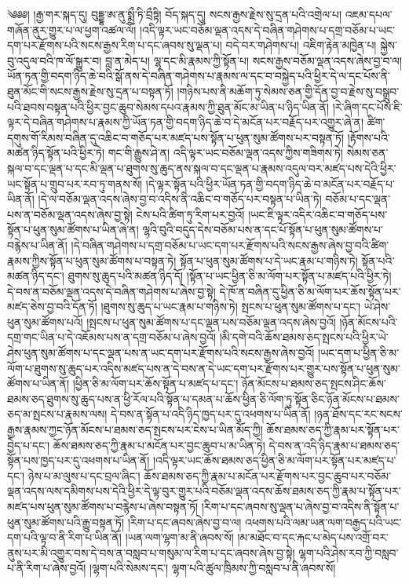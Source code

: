 ༄༅༅། །རྒྱ་གར་སྐད་དུ། བུདྡྷ་ཨ་ནུ་སྨྲྀ་ཏི་བྲྀཏྟི། བོད་སྐད་དུ། སངས་རྒྱས་རྗེས་སུ་དྲན་པའི་འགྲེལ་པ། འཇམ་དཔལ་གཞོན་ནུར་གྱུར་པ་ལ་ཕྱག་འཚལ་ལོ། །འདི་ལྟར་ཡང་བཅོམ་ལྡན་འདས་དེ་བཞིན་གཤེགས་པ་དགྲ་བཅོམ་པ་ཡང་དག་པར་རྫོགས་པའི་སངས་རྒྱས་རིག་པ་དང་ཞབས་སུ་ལྡན་པ། བདེ་བར་གཤེགས་པ། འཇིག་རྟེན་མཁྱེན་པ། སྐྱེས་བུ་འདུལ་བའི་ཁ་ལོ་སྒྱུར་བ། བླ་ན་མེད་པ། ལྷ་དང་མི་རྣམས་ཀྱི་སྟོན་པ། སངས་རྒྱས་བཅོམ་ལྡན་འདས་ཞེས་བྱ་བ་ལ། ཡོན་ཏན་གྱི་བདག་ཉིད་ཆེ་བའི་སྒོ་ནས་དེ་བཞིན་གཤེགས་པ་རྣམས་ལ་དང་བ་བསྐྱེད་པའི་ཕྱིར་དེ་ལ་དང་པོས་ནི་ཐུན་མོང་གི་སངས་རྒྱས་རྗེས་སུ་དྲན་པ་བསྟན་ཏོ། །གཉིས་པས་ནི་མཆོག་ཏུ་སེམས་ཅན་གྱི་དོན་བྱ་བ་རྗེས་སུ་བསྒྲུབ་པའི་ཐབས་བསྟན་པའི་ཕྱིར་བྱང་ཆུབ་སེམས་དཔའ་རྣམས་ཀྱི་ཐུན་མོང་མ་ཡིན་པ་ཉིད་ཡིན་ནོ། །རེ་ཞིག་དང་པོས་ཇི་ལྟར་དེ་བཞིན་གཤེགས་པ་རྣམས་ཀྱི་ཡོན་ཏན་གྱི་བདག་ཉིད་ཆེ་བ་དེ་མངོན་པར་བརྗོད་པར་འགྱུར་ཞེ་ན། ཚིག་དགུས་གོ་རིམས་བཞིན་དུ་འཆིང་བ་གཅོད་པར་མཛད་པས་སྟོན་པ་ཕུན་སུམ་ཚོགས་པར་བསྟན་ཏོ། །རྟོགས་པའི་མཚན་ཉིད་སྟོན་པའི་ཕྱིར་ཏེ། གང་གི་རྒྱུས་ཤེ་ན། འདི་ལྟར་ཡང་བཅོམ་ལྡན་འདས་ཀྱིས་གཟིགས་ཏེ། སེམས་ཅན་སྐལ་བ་དང་ལྡན་པ་དང་མི་ལྡན་པ་ཐུགས་སུ་ཆུད་ནས་སྐལ་བ་དང་ལྡན་པ་རྣམས་འདུལ་བར་མཛད་པས་དེའི་ཕྱིར་ཡང་སྟོན་པ་གྲུབ་པར་རབ་ཏུ་གནས་སོ། །དེ་ལྟར་སྟོན་པའི་ཕྱིར་ཡོན་ཏན་གྱི་བདག་ཉིད་ཆེ་བ་མངོན་པར་བརྗོད་པ་ཡིན་ནོ། །དེ་ལ་བཅོམ་ལྡན་འདས་ཞེས་བྱ་བ་འདིས་ནི་འཆིང་བ་གཅོད་པར་བསྟན་པ་ཡིན་ཏེ། བཅོམ་པ་དང་ལྡན་པས་ན་བཅོམ་ལྡན་འདས་ཞེས་བྱ་སྟེ། ངེས་པའི་ཚིག་ཏུ་རིག་པར་བྱའོ། །ཡང་ཇི་ལྟར་འདིར་འཆིང་བ་གཅོད་པས་སྟོན་པ་ཕུན་སུམ་ཚོགས་པ་ཡིན་ཞེ་ན། ལྷའི་བུའི་བདུད་དེས་བཅོམ་པས་ན་དང་པོ་སྟོན་པ་ཕུན་སུམ་ཚོགས་པ་བརྙེས་པ་ཡིན་ནོ། །དེ་བཞིན་གཤེགས་པ་དགྲ་བཅོམ་པ་ཡང་དག་པར་རྫོགས་པའི་སངས་རྒྱས་ཞེས་བྱ་བའི་ཚིག་རྣམས་ཀྱིས་སྟོན་པ་ཕུན་སུམ་ཚོགས་པ་བསྟན་ཏེ། སྟོན་པ་ཕུན་སུམ་ཚོགས་པ་དེ་ཡང་རྣམ་པ་གཉིས་ཏེ། སྟོན་པའི་མཚན་ཉིད་དང་། ཐུགས་སུ་ཆུད་པའི་མཚན་ཉིད་དོ། །སྟོན་པ་ཡང་ཕྱིན་ཅི་མ་ལོག་པར་སྟོན་པ་མཛད་པའི་ཕྱིར་ཏེ། དེ་བས་ན་བཅོམ་ལྡན་འདས་དེ་བཞིན་གཤེགས་པ་ཞེས་བྱ་སྟེ། དེ་ཁོ་ན་བཞིན་དུ་ཕྱིན་ཅི་མ་ལོག་པར་ཆོས་སྟོན་པར་མཛད་ཅེས་བྱ་བའི་དོན་ཏོ། །ཐུགས་སུ་ཆུད་པ་ཡང་རྣམ་པ་གཉིས་ཏེ། སྤངས་པ་ཕུན་སུམ་ཚོགས་པ་དང་། ཡེ་ཤེས་ཕུན་སུམ་ཚོགས་པའོ། །སྤངས་པ་ཕུན་སུམ་ཚོགས་པ་དང་ལྡན་པས་བཅོམ་ལྡན་འདས་ཞེས་བྱའོ། །ཉོན་མོངས་པའི་དགྲ་གང་ཡིན་པ་དེ་འཇོམས་པས་ན་དགྲ་བཅོམ་པ་ཞེས་བྱའོ། །མི་དགེ་བའི་ཆོས་ཐམས་ཅད་སྤངས་པའི་ཕྱིར་ཡེ་ཤེས་ཕུན་སུམ་ཚོགས་པ་དང་ལྡན་པས་ན་ཡང་དག་པར་རྫོགས་པའི་སངས་རྒྱས་ཞེས་བྱའོ། །ཡང་དག་པ་ཕྱིན་ཅི་མ་ལོག་པ་ཐུགས་སུ་ཆུད་པར་འདིས་མཛད་པས་ན་དེ་བས་ན་དེ་ཡང་དག་པར་རྫོགས་པར་གྱུར་པས་སྟོན་པ་ཕུན་སུམ་ཚོགས་པ་ཡིན་ནོ། །ཕྱིན་ཅི་མ་ལོག་པར་ཆོས་སྟོན་པ་མཛད་པ་དང་། ཉོན་མོངས་པ་ཐམས་ཅད་སྤངས་ཤིང་ཆོས་ཐམས་ཅད་ཐུགས་སུ་ཆུད་པས་ན་ཕྱི་རོལ་པའི་སྟོན་པ་དམན་པ་ཆོས་ཕྱིན་ཅི་ལོག་ཏུ་སྟོན་ཅིང་ཉོན་མོངས་པ་ཐམས་ཅད་མ་སྤངས་པ་རྣམས་ལས། དེ་བས་ན་སྟོན་པ་འདི་ཉིད་ཁྱད་པར་དུ་འཕགས་པ་ཡིན་ནོ། །ཉན་ཐོས་དང་རང་སངས་རྒྱས་རྣམས་ཀྱང་ཉོན་མོངས་པ་ཐམས་ཅད་སྤངས་པར་ངེས་པ་ཡིན་མོད་ཀྱི། ཆོས་ཐམས་ཅད་ཀྱི་རྣམ་པར་སྟོན་པར་བྱེད་པ་དང་། ཆོས་ཐམས་ཅད་ཀྱི་རྣམ་པ་མངོན་པར་བྱང་ཆུབ་པ་མ་ཡིན་ཏེ། དེ་བས་ན་འདི་ཉིད་རྣམ་པ་ཐམས་ཅད་སྟོན་པས་ཁྱད་པར་དུ་འཕགས་པ་ཡིན་ནོ། །འདི་ལྟར་ཡང་ཆོས་ཐམས་ཅད་ཕྱིན་ཅི་མ་ལོག་པར་སྟོན་པར་མཛད་པ་དང་། ཉེས་པ་མ་ལུས་པ་དང་བྲལ་ཞིང་། ཆོས་ཐམས་ཅད་ཀྱི་རྣམ་པ་མངོན་པར་རྫོགས་པར་བྱང་ཆུབ་པར་བཅོམ་ལྡན་འདས་ལས་དམིགས་པས་དེའི་ཕྱིར་དེ་ལྟ་བུར་གྱུར་པའི་བཅོམ་ལྡན་འདས་ཆོས་ཐམས་ཅད་ཀྱི་རྣམ་པ་སྟོན་པར་མཛད་པས་ཕུན་སུམ་ཚོགས་པ་བརྙེས་པ་ཞེས་བསྟན་ཏོ། །རིག་པ་དང་ཞབས་སུ་ལྡན་པ་ཞེས་བྱ་བ་འདིས་ནི་སྟོན་པ་ཕུན་སུམ་ཚོགས་པའི་རྒྱུ་བསྟན་ཏོ། །རིག་པ་དང་ཞབས་ཞེས་བྱ་བ་ལ། འཕགས་པའི་ལམ་ཡན་ལག་བརྒྱད་པའི་ཡང་དག་པའི་ལྟ་བ་ནི་རིག་པ་ཡིན་ནོ། །ཡན་ལག་ལྷག་མ་ནི་ཞབས་སོ། །མ་མཐོང་བ་དང་རྐང་པ་མེད་པས་འགྲོ་བར་ནུས་པར་མི་འགྱུར་བས་དེ་བས་ན་བསླབ་པ་གསུམ་ལ་རིག་པ་དང་ཞབས་ཞེས་བྱ་སྟེ། ལྷག་པའི་ཤེས་རབ་ཀྱི་བསླབ་པ་ནི་རིག་པ་ཞེས་བྱའོ། །ལྷག་པའི་སེམས་དང་། ལྷག་པའི་ཚུལ་ཁྲིམས་ཀྱི་བསླབ་པ་ནི་ཞབས་སོ། 